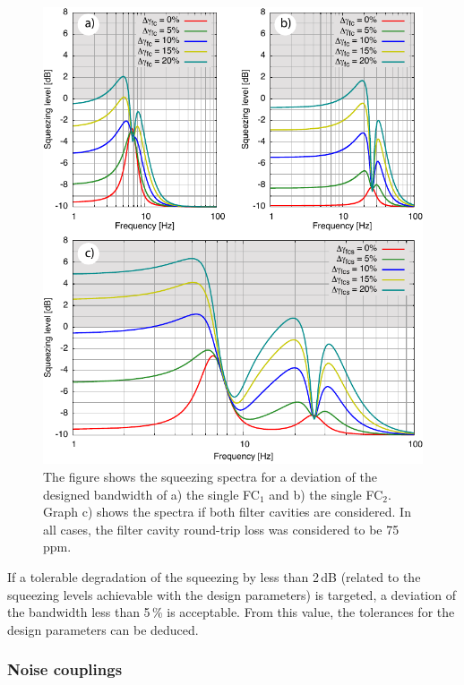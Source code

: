 \begin{figure}
\centering
\includegraphics{./Sec_Optics/FCi-devbw_reviewAI.pdf}
\caption{The figure shows the squeezing spectra for a deviation of the designed bandwidth of a) the single FC$_1$  and b) the single FC$_2$. Graph c) shows the spectra if both  filter cavities are considered. In all cases, the filter cavity round-trip loss was considered to be 75\,ppm.}
\label{fig:devBW}
\end{figure}

If a tolerable  degradation  of the squeezing  by less than 2\,dB (related to the squeezing levels  achievable with  the  design parameters) is targeted, a deviation of the bandwidth less than 5\,\% is acceptable. From this value, the tolerances for the design parameters can be deduced. %



\FloatBarrier
\subsubsection{Noise couplings}\label{sec:noise}

